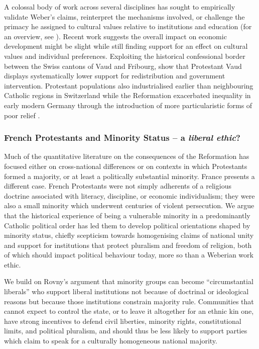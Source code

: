 \documentclass[12pt]{article}
\begin{document}
A colossal body of work across several disciplines has sought to empirically validate Weber's claims, reinterpret the mechanisms involved, or challenge the primacy he assigned to cultural values relative to institutions and education (for an overview, see \cite{marshallSearchSpiritCapitalism1993}). Recent work suggests the overall impact on economic development might be slight \parencite{delacroixBelovedMythProtestantism2001, cantoniEconomicEffectsProtestant2015a} while still finding support for an effect on cultural values and individual preferences. Exploiting the historical confessional border between the Swiss cantons of Vaud and Fribourg, \textcite{bastenWorkEthicReligion2013} show that Protestant Vaud displays systematically lower support for redistribution and government intervention. Protestant populations also industrialised earlier than neighbouring Catholic regions in Switzerland \parencite{spaterProtestantEthicReexamined2019} while the Reformation exacerbated inequality in early modern Germany through the introduction of more particularistic forms of poor relief \parencite{schaffUnequalSpiritProtestant2025}. 

\subsubsection{French Protestants and Minority Status -- a \textit{liberal ethic}?}

Much of the quantitative literature on the consequences of the Reformation has focused either on cross-national differences or on contexts in which Protestants formed a majority, or at least a politically substantial minority. France presents a different case. French Protestants were not simply adherents of a religious doctrine associated with literacy, discipline, or economic individualism; they were also a small minority which underwent centuries of violent persecution. We argue that the historical experience of being a vulnerable minority in a predominantly Catholic political order has led them to develop political orientations shaped by minority status, chiefly scepticism towards homogenising claims of national unity and support for institutions that protect pluralism and freedom of religion, both of which should impact political behaviour today, more so than a Weberian work ethic.

We build on Rovny's \parencite*{rovnyEthnicMinoritiesPolitical2024, rovnyAntidoteBackslidingEthnic2023} argument that minority groups can become ``circumstantial liberals” who support liberal institutions not because of doctrinal or ideological reasons but because those institutions constrain majority rule. Communities that cannot expect to control the state, or to leave it altogether for an ethnic kin one, have strong incentives to defend civil liberties, minority rights, constitutional limits, and political pluralism, and should thus be less likely to support parties which claim to speak for a culturally homogeneous national majority. 
\end{document}
